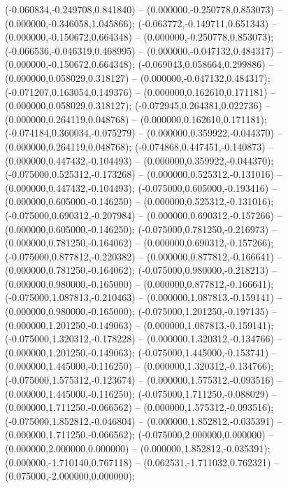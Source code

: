  (-0.060834,-0.249708,0.841840) -- (0.000000,-0.250778,0.853073) -- (0.000000,-0.346058,1.045866);
 (-0.063772,-0.149711,0.651343) -- (0.000000,-0.150672,0.664348) -- (0.000000,-0.250778,0.853073);
 (-0.066536,-0.046319,0.468995) -- (0.000000,-0.047132,0.484317) -- (0.000000,-0.150672,0.664348);
 (-0.069043,0.058664,0.299886) -- (0.000000,0.058029,0.318127) -- (0.000000,-0.047132,0.484317);
 (-0.071207,0.163054,0.149376) -- (0.000000,0.162610,0.171181) -- (0.000000,0.058029,0.318127);
 (-0.072945,0.264381,0.022736) -- (0.000000,0.264119,0.048768) -- (0.000000,0.162610,0.171181);
 (-0.074184,0.360034,-0.075279) -- (0.000000,0.359922,-0.044370) -- (0.000000,0.264119,0.048768);
 (-0.074868,0.447451,-0.140873) -- (0.000000,0.447432,-0.104493) -- (0.000000,0.359922,-0.044370);
 (-0.075000,0.525312,-0.173268) -- (0.000000,0.525312,-0.131016) -- (0.000000,0.447432,-0.104493);
 (-0.075000,0.605000,-0.193416) -- (0.000000,0.605000,-0.146250) -- (0.000000,0.525312,-0.131016);
 (-0.075000,0.690312,-0.207984) -- (0.000000,0.690312,-0.157266) -- (0.000000,0.605000,-0.146250);
 (-0.075000,0.781250,-0.216973) -- (0.000000,0.781250,-0.164062) -- (0.000000,0.690312,-0.157266);
 (-0.075000,0.877812,-0.220382) -- (0.000000,0.877812,-0.166641) -- (0.000000,0.781250,-0.164062);
 (-0.075000,0.980000,-0.218213) -- (0.000000,0.980000,-0.165000) -- (0.000000,0.877812,-0.166641);
 (-0.075000,1.087813,-0.210463) -- (0.000000,1.087813,-0.159141) -- (0.000000,0.980000,-0.165000);
 (-0.075000,1.201250,-0.197135) -- (0.000000,1.201250,-0.149063) -- (0.000000,1.087813,-0.159141);
 (-0.075000,1.320312,-0.178228) -- (0.000000,1.320312,-0.134766) -- (0.000000,1.201250,-0.149063);
 (-0.075000,1.445000,-0.153741) -- (0.000000,1.445000,-0.116250) -- (0.000000,1.320312,-0.134766);
 (-0.075000,1.575312,-0.123674) -- (0.000000,1.575312,-0.093516) -- (0.000000,1.445000,-0.116250);
 (-0.075000,1.711250,-0.088029) -- (0.000000,1.711250,-0.066562) -- (0.000000,1.575312,-0.093516);
 (-0.075000,1.852812,-0.046804) -- (0.000000,1.852812,-0.035391) -- (0.000000,1.711250,-0.066562);
 (-0.075000,2.000000,0.000000) -- (0.000000,2.000000,0.000000) -- (0.000000,1.852812,-0.035391);
 (0.000000,-1.710140,0.767118) -- (0.062531,-1.711032,0.762321) -- (0.075000,-2.000000,0.000000);
